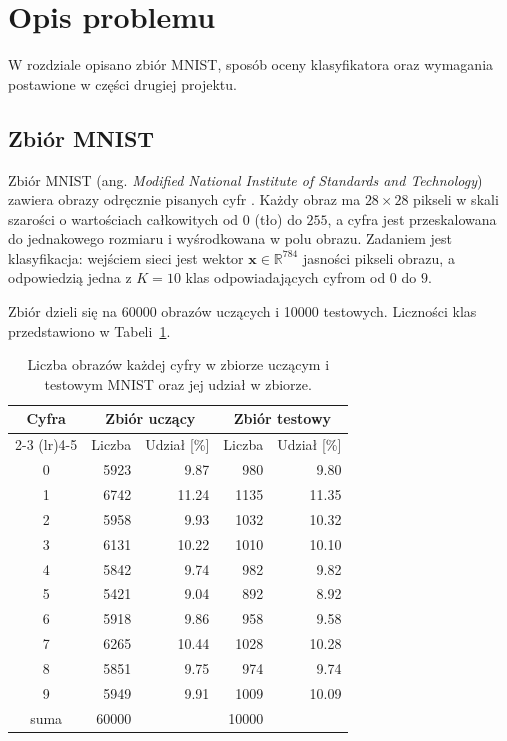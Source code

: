 \section{Opis problemu}
\label{sec:problem}

W rozdziale opisano zbiór MNIST, sposób oceny klasyfikatora oraz wymagania postawione w części drugiej projektu.

\subsection{Zbiór MNIST}
\label{sec:problem-dataset}

Zbiór MNIST (ang. \textit{Modified National Institute of Standards and Technology}) zawiera obrazy odręcznie pisanych cyfr \cite{lecun1998}. Każdy obraz ma $28 \times 28$ pikseli w skali szarości o wartościach całkowitych od $0$ (tło) do $255$, a cyfra jest przeskalowana do jednakowego rozmiaru i wyśrodkowana w polu obrazu. Zadaniem jest klasyfikacja: wejściem sieci jest wektor $\mathbf{x} \in \mathbb{R}^{784}$ jasności pikseli obrazu, a odpowiedzią jedna z $K = 10$ klas odpowiadających cyfrom od $0$ do $9$.

Zbiór dzieli się na \num{60000} obrazów uczących i \num{10000} testowych. Liczności klas przedstawiono w Tabeli~\ref{tab:mnist-classes}.

\begin{table}[H]
    \centering
    \caption{Liczba obrazów każdej cyfry w zbiorze uczącym i testowym MNIST oraz jej udział w zbiorze.}
    \label{tab:mnist-classes}
    \begin{tabular}{crrrr}
        \toprule
        Cyfra & \multicolumn{2}{c}{Zbiór uczący} & \multicolumn{2}{c}{Zbiór testowy} \\
        \cmidrule(lr){2-3} \cmidrule(lr){4-5}
        & Liczba & Udział [\%] & Liczba & Udział [\%] \\
        \midrule
        0 & \num{5923} & \num{9.87} & \num{980} & \num{9.80} \\
        1 & \num{6742} & \num{11.24} & \num{1135} & \num{11.35} \\
        2 & \num{5958} & \num{9.93} & \num{1032} & \num{10.32} \\
        3 & \num{6131} & \num{10.22} & \num{1010} & \num{10.10} \\
        4 & \num{5842} & \num{9.74} & \num{982} & \num{9.82} \\
        5 & \num{5421} & \num{9.04} & \num{892} & \num{8.92} \\
        6 & \num{5918} & \num{9.86} & \num{958} & \num{9.58} \\
        7 & \num{6265} & \num{10.44} & \num{1028} & \num{10.28} \\
        8 & \num{5851} & \num{9.75} & \num{974} & \num{9.74} \\
        9 & \num{5949} & \num{9.91} & \num{1009} & \num{10.09} \\
        \midrule
        suma & \num{60000} & & \num{10000} & \\
        \bottomrule
    \end{tabular}
\end{table}

